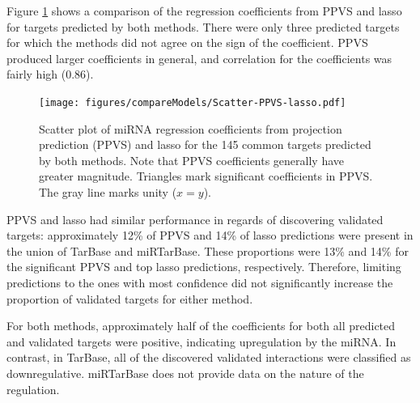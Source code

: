 Figure \ref{fig:scatter-ppvs-lasso} shows a comparison of the regression
coefficients from PPVS and lasso for targets predicted by both methods. There
were only three predicted targets for which the methods did not agree on the
sign of the coefficient. PPVS produced larger coefficients in general, and
correlation for the coefficients was fairly high ($0.86$).

\begin{figure}[htb]
  \centering
  \texttt{[image: figures/compareModels/Scatter-PPVS-lasso.pdf]}
  \caption{Scatter plot of miRNA regression coefficients from projection
  prediction (PPVS) and lasso for the 145 common targets predicted by both methods.
  Note that PPVS coefficients generally have greater magnitude. Triangles
  mark significant coefficients in PPVS. The gray
  line marks unity ($x=y$).}
  \label{fig:scatter-ppvs-lasso}
\end{figure}

PPVS and lasso had similar performance in regards of discovering validated
targets: approximately 12\% of PPVS and 14\% of lasso predictions were present
in the union of TarBase and miRTarBase. These proportions were 13\% and 14\% for
the significant PPVS and top lasso predictions, respectively. Therefore,
limiting predictions to the ones with most confidence did not significantly increase
the proportion of validated targets for either method.

For both methods, approximately half of the coefficients for both all
predicted and validated targets were positive, indicating upregulation by the
miRNA. In contrast, in TarBase, all of the discovered validated interactions
were classified as downregulative. miRTarBase does not provide data on the
nature of the regulation.
